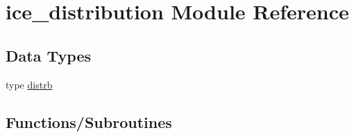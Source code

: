 \hypertarget{namespaceice__distribution}{
\section{ice\_\-distribution Module Reference}
\label{namespaceice__distribution}
}
\subsection*{Data Types}
\begin{DoxyCompactItemize}
\item 
type \hyperlink{typeice__distribution_1_1distrb}{distrb}
\end{DoxyCompactItemize}
\subsection*{Functions/Subroutines}
